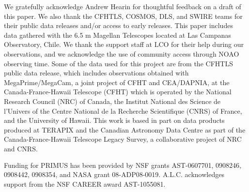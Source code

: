 \documentclass[apj,tighten,iop]{emulateapj2}
\begin{document}










\acknowledgements
We gratefully acknowledge Andrew Hearin for thoughtful feedback on a draft of this paper.
We also thank the CFHTLS, COSMOS, DLS, and SWIRE teams for their public data releases and/or access to early releases.
This paper includes data gathered with the 6.5 m Magellan Telescopes located at Las Campanas Observatory, Chile.
We thank the support staff at LCO for their help during our observations, and we acknowledge the use of community access through NOAO observing time.
Some of the data used for this project are from the CFHTLS public data release, which includes observations obtained with MegaPrime/MegaCam, a joint project of CFHT and CEA/DAPNIA, at the Canada-France-Hawaii Telescope (CFHT) which is operated by the National Research Council (NRC) of Canada, the Institut National des Science de l'Univers of the Centre National de la Recherche Scientifique (CNRS) of France, and the University of Hawaii.
This work is based in part on data products produced at TERAPIX and the Canadian Astronomy Data Centre as part of the Canada-France-Hawaii Telescope Legacy Survey, a collaborative project of NRC and CNRS.

Funding for PRIMUS has been provided by NSF grants AST-0607701, 0908246, 0908442, 0908354, and NASA grant 08-ADP08-0019.
A.L.C. acknowledges support from the NSF CAREER award AST-1055081.


\end{document}
